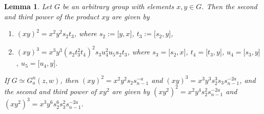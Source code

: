 \documentclass{amsart}
\newtheorem{lemma}{Lemma}[section]
\theoremstyle{definition}
\numberwithin{equation}{section}
\begin{document}
\begin{lemma}
\label{lem:Powers}
Let \(G\) be an arbitrary group with elements \(x,y\in G\).
Then the second and third power of the product \(xy\) are given by
\begin{enumerate}
\item
\((xy)^2=x^2y^2s_2t_3\), where \(s_2:=\lbrack y,x\rbrack\), \(t_3:=\lbrack s_2,y\rbrack\),
\item
\((xy)^3=x^3y^3(s_2t_3^2t_4)^2s_3u_4^2u_5s_2t_3\), where \(s_3=\lbrack s_2,x\rbrack\), \(t_4=\lbrack t_3,y\rbrack\),
\(u_4=\lbrack s_3,y\rbrack\), \(u_5=\lbrack u_4,y\rbrack\).
\end{enumerate}
If \(G\simeq G_a^n(z,w)\), then \((xy)^2=x^2y^2s_2s_{n-1}^{-a}\) and \((xy)^3=x^3y^3s_2^3s_3s_{n-1}^{-2a}\),
and the second and third power of \(xy^2\) are given by
\((xy^2)^2=x^2y^4s_2^2s_{n-1}^{-2a}\) and \((xy^2)^3=x^3y^6s_2^6s_3^2s_{n-1}^{-2a}\).
\end{lemma}

\end{document}
